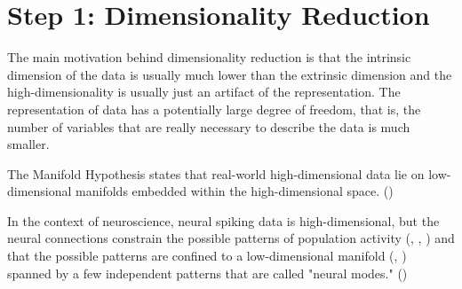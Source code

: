\section{Step 1: Dimensionality Reduction}

The main motivation behind dimensionality reduction is that the intrinsic dimension of the data is usually much lower than the extrinsic dimension and the high-dimensionality is usually just an artifact of the representation. The representation of data has a potentially large degree of freedom, that is, the number of variables that are really necessary to describe the data is much smaller.

The Manifold Hypothesis states that real-world high-dimensional data lie on low-dimensional manifolds embedded within the high-dimensional space. (\cite{deepai_2019})

In the context of neuroscience, neural spiking data is high-dimensional, but the neural connections constrain the possible patterns of population activity (\cite{okun_diverse_2015}, \cite{sadtler_neural_2014}, \cite{tsodyks_attractor_1999}) and that the possible patterns are confined to a low-dimensional manifold (\cite{stopfer_intensity_2003},  \cite{yu_gaussian-process_2009}) spanned by a few independent patterns that are called "neural modes." (\cite{gallego_neural_2017})

